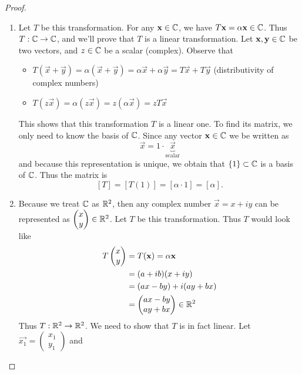 \begin{proof}
  \text{}
  \begin{enumerate}
    \item Let $T$ be this transformation. For any $\mathbf{x}\in\mathbb{C}$, we have
      $T\mathbf{x}=\alpha \mathbf{x}\in\mathbb{C}$.
      Thus $T:\mathbb{C}\to\mathbb{C}$, and we'll prove that $T$ is a linear 
      transformation. Let $\mathbf{x},\mathbf{y}\in\mathbb{C}$ be two vectors, 
      and $z\in\mathbb{C}$ be a scalar (complex). Observe that
      \begin{itemize}
        \item $T(\vec{x}+\vec{y})=\alpha(\vec{x}+\vec{y})
          =\alpha\vec{x}+\alpha\vec{y}=T\vec{x}+T\vec{y}$
          \quad (distributivity of complex numbers)
        \item $T(z\vec{x})=\alpha(z\vec{x})=z(\alpha\vec{x})=zT\vec{x}$
      \end{itemize}
      This shows that this transformation $T$ is a linear one.
      To find its matrix, we only need to know the basis of $\mathbb{C}$.
      Since any vector $\mathbf{x}\in\mathbb{C}$ we be written as 
      \[\vec{x}=1\cdot \underbrace{\vec{x}}_{\text{scalar}}\]
      and because this representation is unique, we obtain that 
      $\{1\}\subset\mathbb{C}$ is a basis of $\mathbb{C}$. Thus the matrix is
      \[
        [T]=[T(1)]=[\alpha\cdot 1]=[\alpha].
      \]
    \item Because we treat $\mathbb{C}$ as $\mathbb{R}^2$, then any complex number 
      $\vec{x}=x+iy$ can be represented as 
      $\begin{pmatrix} x\\y \end{pmatrix}\in\mathbb{R}^2$.
      Let $T$ be this transformation. Thus $T$ would look like
      \begin{align*}
        T\begin{pmatrix} x\\y \end{pmatrix}
        &=T(\mathbf{x})=\alpha\mathbf{x}\\
        &=(a+ib)(x+iy)\\
        &=(ax-by)+i(ay+bx)\\
        &=\begin{pmatrix} ax-by\\ay+bx \end{pmatrix}\in\mathbb{R}^2
      \end{align*}
      Thus $T:\mathbb{R}^2\to\mathbb{R}^2$.
      We need to show that $T$ is in fact linear. Let 
      $\vec{x_1}= \begin{pmatrix} x_1\\y_1 \end{pmatrix} $ and 

\end{enumerate}
\end{proof}
